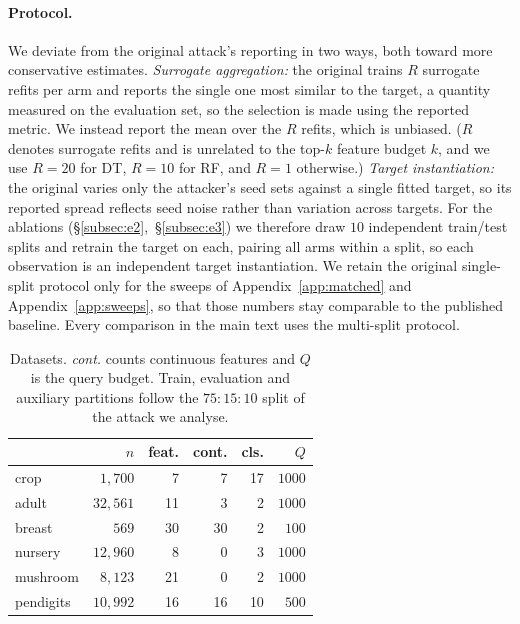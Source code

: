 \documentclass[sigconf,anonymous,review]{acmart}
\begin{document}
\paragraph{Protocol.} We deviate from the original attack's reporting in two ways, both toward more
conservative estimates. \emph{Surrogate aggregation:} the original trains $R$ surrogate refits per
arm and reports the single one most similar to the target, a quantity measured on the evaluation set,
so the selection is made using the reported metric. We instead report the mean over the $R$ refits,
which is unbiased. ($R$ denotes surrogate refits and is unrelated to the top-$k$ feature budget $k$, and we use $R{=}20$ for DT, $R{=}10$ for RF, and $R{=}1$ otherwise.)
\emph{Target instantiation:} the original varies only the attacker's seed sets against a single fitted
target, so its reported spread reflects seed noise rather than variation across targets. For the
ablations (\S\ref{subsec:e2},~\S\ref{subsec:e3}) we therefore draw $10$ independent train/test splits
and retrain the target on each, pairing all arms within a split, so each observation is an independent
target instantiation. 
We retain the original single-split protocol only for the sweeps of
Appendix~\ref{app:matched} and Appendix~\ref{app:sweeps}, so that those numbers stay comparable to
the published baseline. Every comparison in the main text uses the multi-split protocol. 

\begin{table}[t]
\centering
\caption{Datasets. \emph{cont.} counts continuous features and $Q$ is the query budget. Train, evaluation
and auxiliary partitions follow the $75\!:\!15\!:\!10$ split of the attack we analyse.}
\label{tab:datasets}
\begin{tabular}{lrrrrr}
\toprule
 & $n$ & feat. & cont. & cls. & $Q$ \\
\midrule
crop      & $1{,}700$  & 7  & 7  & 17 & $1000$ \\
adult     & $32{,}561$ & 11 & 3  & 2  & $1000$ \\
breast    & $569$      & 30 & 30 & 2  & $100$  \\
nursery   & $12{,}960$ & 8  & 0  & 3  & $1000$ \\
mushroom  & $8{,}123$  & 21 & 0  & 2  & $1000$ \\
pendigits & $10{,}992$ & 16 & 16 & 10 & $500$  \\
\bottomrule
\end{tabular}
\end{table}
\end{document}

